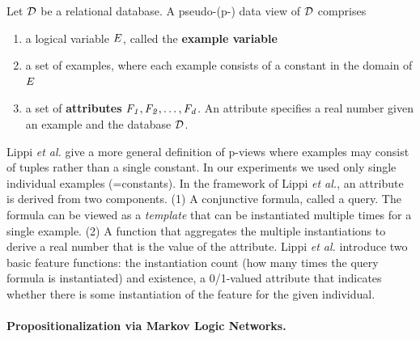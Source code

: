 \begin{definition}
	Let $\mathcal{D}$ be a relational database. A pseudo-\iid (p-\iid) data view of $\mathcal{D}$ comprises 
	
	\begin{enumerate}
		\item a logical variable $E$, called the \textbf{example variable}
		\item a set of examples, where each example consists of a constant in the domain of $E$
		\item a set of \textbf{attributes} $\it{F}_{1},\it{F}_{2},\ldots,\it{F}_{d}$. An attribute specifies a real number given an example and the database $\mathcal{D}$. 
	\end{enumerate}
\end{definition}

Lippi {\em et al.} give a more general definition of p-\iid views where examples may consist of tuples rather than a single constant. In our experiments we used only single individual examples (=constants). In the framework of Lippi {\em et al.}, an attribute is derived from two components. (1) A conjunctive formula, called a query. The formula can be viewed as a {\em template} that can be instantiated multiple times for a single example. (2) A function that aggregates the multiple instantiations to derive a real number that is the value of the attribute. Lippi {\em et al.} introduce two basic feature functions: the instantiation count (how many times the query formula is instantiated) and existence, a 0/1-valued attribute that indicates whether there is some instantiation of the feature for the given individual. 
\paragraph{Propositionalization via Markov Logic Networks.}




